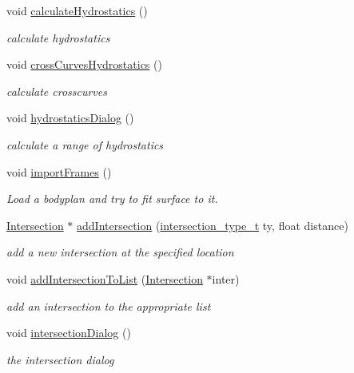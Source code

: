 \begin{DoxyCompactItemize}
\item 
void \hyperlink{classShipCAD_1_1Controller_a3b4ee09db0e5df18f9f5d58048156117}{calculate\-Hydrostatics} ()
\begin{DoxyCompactList}\small\item\em calculate hydrostatics \end{DoxyCompactList}\item 
void \hyperlink{classShipCAD_1_1Controller_a8e45334c9b25b8241ef4af126f6d5cc0}{cross\-Curves\-Hydrostatics} ()
\begin{DoxyCompactList}\small\item\em calculate crosscurves \end{DoxyCompactList}\item 
void \hyperlink{classShipCAD_1_1Controller_af3cb8f74ad629b252e41d18dd4eafaf5}{hydrostatics\-Dialog} ()
\begin{DoxyCompactList}\small\item\em calculate a range of hydrostatics \end{DoxyCompactList}\item 
void \hyperlink{classShipCAD_1_1Controller_a3006d50bf1be37732d602d452d7adf30}{import\-Frames} ()
\begin{DoxyCompactList}\small\item\em Load a bodyplan and try to fit surface to it. \end{DoxyCompactList}\item 
\hyperlink{classShipCAD_1_1Intersection}{Intersection} $\ast$ \hyperlink{classShipCAD_1_1Controller_ae9ca2e62f46b41b322e7f78349fa20bf}{add\-Intersection} (\hyperlink{namespaceShipCAD_aa56834b730aafdf2786ddc9a60a046fd}{intersection\-\_\-type\-\_\-t} ty, float distance)
\begin{DoxyCompactList}\small\item\em add a new intersection at the specified location \end{DoxyCompactList}\item 
void \hyperlink{classShipCAD_1_1Controller_a4be6dfd0fb455f3d30c728890464c977}{add\-Intersection\-To\-List} (\hyperlink{classShipCAD_1_1Intersection}{Intersection} $\ast$inter)
\begin{DoxyCompactList}\small\item\em add an intersection to the appropriate list \end{DoxyCompactList}\item 
void \hyperlink{classShipCAD_1_1Controller_aa96a4f37de274284919284651b9bd22a}{intersection\-Dialog} ()
\begin{DoxyCompactList}\small\item\em the intersection dialog \end{DoxyCompactList}\item 

\end{DoxyCompactItemize}
